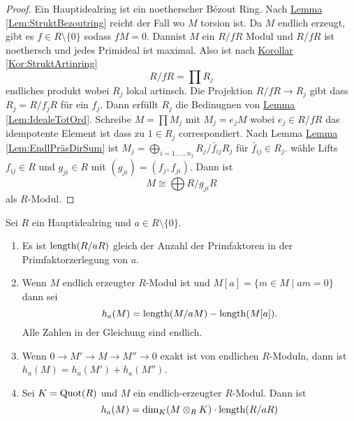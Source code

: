 \begin{proof}
    Ein Hauptidealring ist ein noetherscher Bézout Ring. Nach \hyperref[Lem:StruktBezoutring]{Lemma \ref{Lem:StruktBezoutring}} reicht der Fall wo $M$ torsion ist. Da $M$ endlich erzeugt, gibt es $f\in R\setminus\{0\}$ sodass $fM=0$. Dannist $M$ ein $R/fR$ Modul und $R/fR$ ist noethersch und jedes Primideal ist maximal. Also ist  nach \hyperref[Kor:StruktArtinring]{Korollar \ref{Kor:StruktArtinring}} $$R/fR=\prod R_j$$ endliches produkt wobei $R_j$ lokal artinsch. Die Projektion $R/fR\to R_j$ gibt dass $R_j=R/f_jR$ für ein $f_j$. Dann erfüllt $R_j$ die Bedinugnen von \hyperref[Lem:IdealeTotOrd]{Lemma \ref{Lem:IdealeTotOrd}}. Schreibe $M=\prod M_j$ mit $M_j=e_jM$ wobei $e_j\in R/fR$ das idempotente Element ist dass zu $1\in R_j$ correspondiert.  Nach Lemma \hyperref[Lem:EndlPräsDirSum]{Lemma \ref{Lem:EndlPräsDirSum}} ist $M_j=\bigoplus_{i=1,\dots,n_j}R_j/\bar f_{ij}R_j$ für $\bar f_{ij}\in R_j$. wähle Lifts $f_{ij}\in R$ und $g_{ji}\in R$ mit $(g_{ji})=(f_j,f_{ji})$. Dann ist $$M\cong\bigoplus R/g_{ji}R$$ als $R$-Modul.
\end{proof}
\begin{Lemma}
    Sei $R$ ein Hauptidealring und $a\in R\setminus\{0\}$.
    \begin{enumerate}
        \item Es ist $\operatorname{length}(R/aR)$ gleich der Anzahl der Primfaktoren in der Primfaktorzerlegung von $a$.
        \item Wenn $M$ endlich erzeugter $R$-Modul ist und $M[a]=\{m\in M\mid am=0\}$ dann sei $$h_a(M)=\operatorname{length}(M/aM)-\operatorname{length}(M[a]).$$ Alle Zahlen in der Gleichung sind endlich.
        \item Wenn $0\to M'\to M\to M''\to 0$ exakt ist von endlichen $R$-Moduln, dann ist $h_a(M)=h_a(M')+h_a(M'')$.
        \item Sei $K=\operatorname{Quot}(R)$ und $M$ ein endlich-erzeugter $R$-Modul. Dann ist 
        $$h_a(M)=\dim_K(M\otimes_RK)\cdot\operatorname{length}(R/aR)$$
    \end{enumerate}
\end{Lemma}

